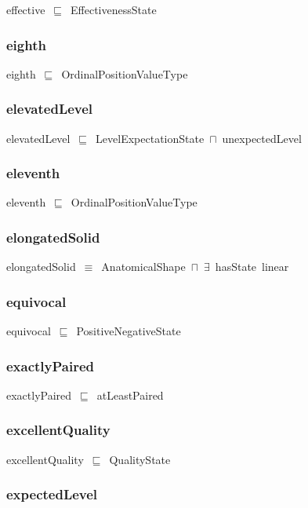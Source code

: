 \documentclass{article}
\begin{document}
effective~\ensuremath{\sqsubseteq}~EffectivenessState~

\subsubsection*{eighth}

eighth~\ensuremath{\sqsubseteq}~OrdinalPositionValueType~

\subsubsection*{elevatedLevel}

elevatedLevel~\ensuremath{\sqsubseteq}~LevelExpectationState~\ensuremath{\sqcap}~unexpectedLevel~

\subsubsection*{eleventh}

eleventh~\ensuremath{\sqsubseteq}~OrdinalPositionValueType~

\subsubsection*{elongatedSolid}

elongatedSolid~\ensuremath{\equiv}~AnatomicalShape~\ensuremath{\sqcap}~\ensuremath{\exists}~hasState~linear

\subsubsection*{equivocal}

equivocal~\ensuremath{\sqsubseteq}~PositiveNegativeState~

\subsubsection*{exactlyPaired}

exactlyPaired~\ensuremath{\sqsubseteq}~atLeastPaired~

\subsubsection*{excellentQuality}

excellentQuality~\ensuremath{\sqsubseteq}~QualityState~

\subsubsection*{expectedLevel}
\end{document}
